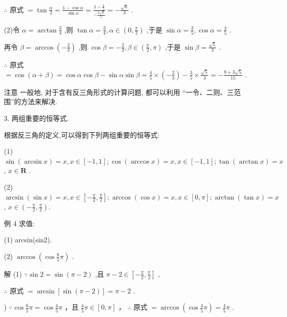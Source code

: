 \documentclass[10pt]{article}
\begin{document}
\(\therefore\) 原式 \(= \tan \frac{\alpha }{2} = \frac{1 - \cos \alpha }{\sin \alpha } = \frac{1 - \frac{1}{5}}{-\frac{2\sqrt{6}}{5}} =  - \frac{\sqrt{6}}{3}\) .

(2)令 \(\alpha  = \arctan \frac{3}{4}\) ,则 \(\tan \alpha  = \frac{3}{4},\alpha  \in  \left( {0,\frac{\pi }{2}}\right)\) ,于是 \(\sin \alpha  = \frac{3}{5},\cos \alpha  = \frac{4}{5}\) .

再令 \(\beta  = \arccos \left( {-\frac{2}{3}}\right)\) ,则 \(\cos \beta  =  - \frac{2}{3},\beta  \in  \left( {\frac{\pi }{2},\pi }\right)\) ,于是 \(\sin \beta  = \frac{\sqrt{5}}{3}\) .

\(\therefore\) 原式 \(= \cos \left( {\alpha  + \beta }\right)  = \cos \alpha \cos \beta  - \sin \alpha \sin \beta  = \frac{4}{5} \times  \left( {-\frac{2}{3}}\right)  - \frac{3}{5} \times  \frac{\sqrt{5}}{3} =  - \frac{8 + 3\sqrt{5}}{15}\) .

注意 一般地, 对于含有反三角形式的计算问题, 都可以利用 “一令、二则、三范围”的方法来解决.

3. 两组重要的恒等式.

根据反三角的定义,可以得到下列两组重要的恒等式:

(1) \(\sin \left( {\arcsin x}\right)  = x,x \in  \left\lbrack  {-1,1}\right\rbrack  ;\cos \left( {\arccos x}\right)  = x,x \in  \left\lbrack  {-1,1}\right\rbrack  ;\tan \left( {\arctan x}\right)  = x\) , \(x \in  \mathbf{R}\) .

(2) \(\arcsin \left( {\sin x}\right)  = x,x \in  \left\lbrack  {-\frac{\pi }{2},\frac{\pi }{2}}\right\rbrack  ;\arccos \left( {\cos x}\right)  = x,x \in  \left\lbrack  {0,\pi }\right\rbrack  ;\arctan \left( {\tan x}\right)  = x\) , \(x \in  \left( {-\frac{\pi }{2},\frac{\pi }{2}}\right) .\)

例 4 求值:

(1) arcsin(sin2).

(2) \(\arccos \left( {\cos \frac{6}{5}\pi }\right)\) .

解 (1) \(\because \sin 2 = \sin \left( {\pi  - 2}\right)\) ,且 \(\pi  - 2 \in  \left\lbrack  {-\frac{\pi }{2},\frac{\pi }{2}}\right\rbrack\) ,

\(\therefore\) 原式 \(= \arcsin \left\lbrack  {\sin \left( {\pi  - 2}\right) }\right\rbrack   = \pi  - 2\) .

) \(\because \cos \frac{6}{5}\pi  = \cos \frac{4}{5}\pi\) ，且 \(\frac{4}{5}\pi  \in  \left\lbrack  {0,\pi }\right\rbrack\) ， \(\therefore\) 原式 \(= \arccos \left( {\cos \frac{4}{5}\pi }\right)  = \frac{4}{5}\pi\) .
\end{document}
